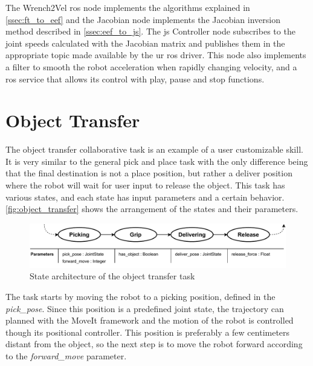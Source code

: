 \par The Wrench2Vel \ac{ros} node implements the algorithms explained in \autoref{ssec:ft_to_eef} and the Jacobian node implements the Jacobian inversion method described in \autoref{ssec:eef_to_js}. The \ac{js} Controller node subscribes to the joint speeds calculated with the Jacobian matrix and publishes them in the appropriate topic made available by the \ac{ur} \ac{ros} driver. This node also implements a filter to smooth the robot acceleration when rapidly changing velocity, and a \ac{ros} service that allows its control with play, pause and stop functions.






\section{Object Transfer}


\par The object transfer collaborative task is an example of a user customizable skill. It is very similar to the general pick and place task with the only difference being that the final destination is not a place position, but rather a deliver position where the robot will wait for user input to release the object. This task has various states, and each state has input parameters and a certain behavior. \autoref{fig:object_transfer} shows the arrangement of the states and their parameters.

\begin{figure}[h]
    \centering
    \includegraphics[width=\linewidth]{figs/chp5/pick_and_deliver.pdf}
    \caption{State architecture of the object transfer task}
    \label{fig:object_transfer}
\end{figure}

\par The task starts by moving the robot to a picking position, defined in the \textit{pick\_pose}. Since this position is a predefined joint state, the trajectory can planned with the MoveIt framework and the motion of the robot is controlled though its positional controller. This position is preferably a few centimeters distant from the object, so the next step is to move the robot forward according to the \textit{forward\_move} parameter.

